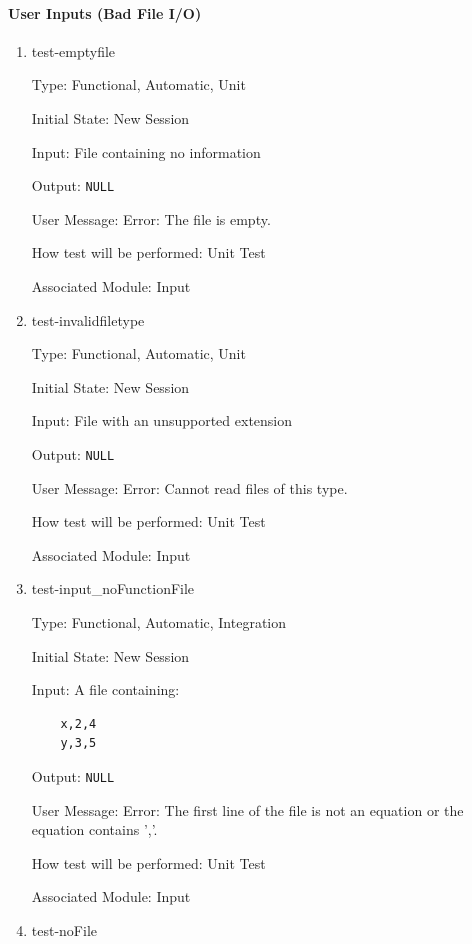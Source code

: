 \documentclass[12pt, titlepage]{article}
\begin{document}
\paragraph{User Inputs (Bad File I/O)}

\begin{enumerate}
	
	\item{test-emptyfile}
	
	Type: Functional, Automatic, Unit
	
	Initial State: New Session
	
	Input: File containing no information
	
	Output: \texttt{NULL}
	
	User Message: Error: The file is empty.
	
	How test will be performed: Unit Test
	
	Associated Module: Input\\
	
	\item{test-invalidfiletype}
	
	Type: Functional, Automatic, Unit
	
	Initial State: New Session
	
	Input: File with an unsupported extension
	
	Output: \texttt{NULL}
	
	User Message: Error: Cannot read files of this type.
	
	How test will be performed: Unit Test
	
	Associated Module: Input\\
	
	\item{test-input\_noFunctionFile}
	
	Type: Functional, Automatic, Integration
	
	Initial State: New Session
	
	Input: A file containing:
	\begin{lstlisting}
	x,2,4
	y,3,5
	\end{lstlisting}
	
	Output: \texttt{NULL}
	
	User Message: Error: The first line of the file is not an equation or the 
	equation contains ','.
	
	How test will be performed: Unit Test
	
	Associated Module: Input\\
	
	\item{test-noFile}
	

\end{enumerate}
\end{document}

